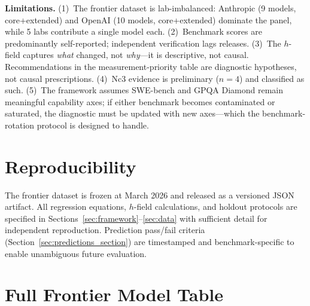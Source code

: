 \documentclass{article}
\begin{document}
\textbf{Limitations.}
(1)~The frontier dataset is lab-imbalanced: Anthropic (9 models, core+extended)
and OpenAI (10 models, core+extended)
dominate the panel, while 5 labs contribute a single model each.
(2)~Benchmark scores are predominantly self-reported; independent verification
lags releases.
(3)~The $h$-field captures \emph{what} changed, not \emph{why}---it is descriptive,
not causal. Recommendations in the measurement-priority table
are diagnostic hypotheses, not causal prescriptions.
(4)~Nc3 evidence is preliminary ($n = 4$) and classified as such.
(5)~The framework assumes SWE-bench and GPQA Diamond remain meaningful capability axes;
if either benchmark becomes contaminated or saturated, the diagnostic must be
updated with new axes---which the benchmark-rotation protocol is designed to handle.





\appendix

\section*{Reproducibility}
The frontier dataset is frozen at March 2026 and released as a versioned JSON artifact.
All regression equations, $h$-field calculations, and holdout protocols
are specified in Sections~\ref{sec:framework}--\ref{sec:data} with sufficient detail
for independent reproduction.
Prediction pass/fail criteria (Section~\ref{sec:predictions_section}) are timestamped
and benchmark-specific to enable unambiguous future evaluation.

\section{Full Frontier Model Table}
\label{app:table}
\end{document}
